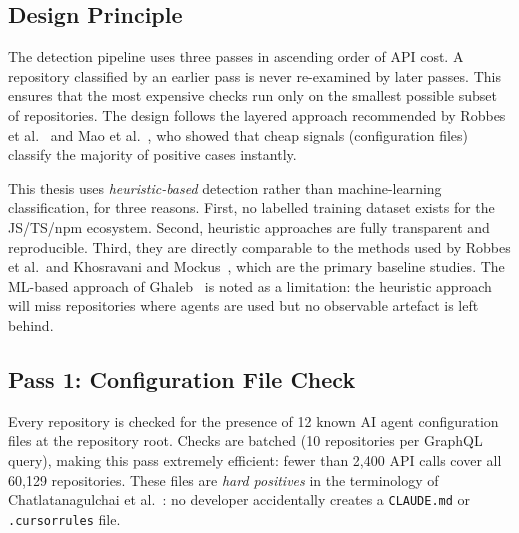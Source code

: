 \documentclass[12pt, a4paper]{article}
\begin{document}
\subsection{Design Principle}

The detection pipeline uses three passes in ascending order of API cost.
A repository classified by an earlier pass is never re-examined by later
passes. This ensures that the most expensive checks run only on the smallest
possible subset of repositories. The design follows the layered approach
recommended by Robbes et al.~\cite{robbesHeuristics2026} and Mao et
al.~\cite{mao2026}, who showed that cheap signals (configuration files)
classify the majority of positive cases instantly.

This thesis uses \emph{heuristic-based} detection rather than
machine-learning classification, for three reasons. First, no labelled
training dataset exists for the JS/TS/npm ecosystem. Second, heuristic
approaches are fully transparent and reproducible. Third, they are directly
comparable to the methods used by Robbes et al.\ and Khosravani and
Mockus~\cite{khosravani2026}, which are the primary baseline studies. The
ML-based approach of Ghaleb~\cite{ghaleb2026} is noted as a limitation:
the heuristic approach will miss repositories where agents are used but no
observable artefact is left behind.

\subsection{Pass 1: Configuration File Check}

Every repository is checked for the presence of 12 known AI agent
configuration files at the repository root. Checks are batched (10
repositories per GraphQL query), making this pass extremely efficient: fewer
than 2,400 API calls cover all 60,129 repositories. These files are
\emph{hard positives} in the terminology of Chatlatanagulchai et
al.~\cite{chatlatanagulchai2025}: no developer accidentally creates a
\texttt{CLAUDE.md} or \texttt{.cursorrules} file.
\end{document}
